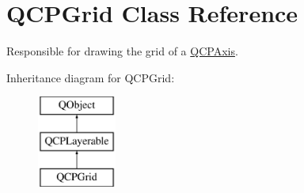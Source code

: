 \hypertarget{classQCPGrid}{\section{Q\-C\-P\-Grid Class Reference}
\label{classQCPGrid}
}


Responsible for drawing the grid of a \hyperlink{classQCPAxis}{Q\-C\-P\-Axis}.  


Inheritance diagram for Q\-C\-P\-Grid\-:\begin{figure}[H]
\begin{center}
\leavevmode
\includegraphics[height=3.000000cm]{classQCPGrid}
\end{center}
\end{figure}
